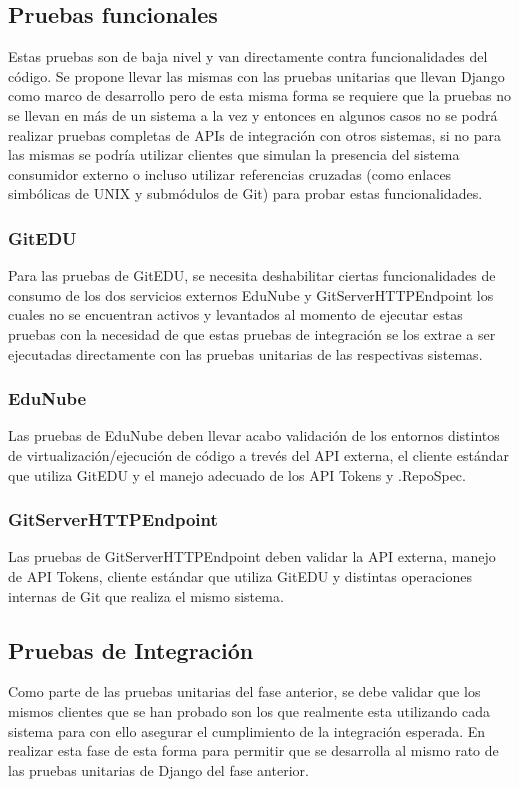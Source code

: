 \subsection{Pruebas funcionales}
Estas pruebas son de baja nivel y van directamente contra funcionalidades del código. Se propone llevar las mismas con las pruebas unitarias que llevan Django como marco de desarrollo pero de esta misma forma se requiere que la pruebas no se llevan en más de un sistema a la vez y entonces en algunos casos no se podrá realizar pruebas completas de APIs de integración con otros sistemas, si no para las mismas se podría utilizar clientes que simulan la presencia del sistema consumidor externo o incluso utilizar referencias cruzadas (como enlaces simbólicas de UNIX y submódulos de Git) para probar estas funcionalidades.

\subsubsection{GitEDU}
Para las pruebas de GitEDU, se necesita deshabilitar ciertas funcionalidades de consumo de los dos servicios externos EduNube y GitServerHTTPEndpoint los cuales no se encuentran activos y levantados al momento de ejecutar estas pruebas con la necesidad de que estas pruebas de integración se los extrae a ser ejecutadas directamente con las pruebas unitarias de las respectivas sistemas.

\subsubsection{EduNube}
Las pruebas de EduNube deben llevar acabo validación de los entornos distintos de virtualización/ejecución de código a trevés del API externa, el cliente estándar que utiliza GitEDU y el manejo adecuado de los API Tokens y .RepoSpec.

\subsubsection{GitServerHTTPEndpoint}
Las pruebas de GitServerHTTPEndpoint deben validar la API externa, manejo de API Tokens, cliente estándar que utiliza GitEDU y distintas operaciones internas de Git que realiza el mismo sistema.

\subsection{Pruebas de Integración}
Como parte de las pruebas unitarias del fase anterior, se debe validar que los mismos clientes que se han probado son los que realmente esta utilizando cada sistema para con ello asegurar el cumplimiento de la integración esperada. En realizar esta fase de esta forma para permitir que se desarrolla al mismo rato de las pruebas unitarias de Django del fase anterior.

